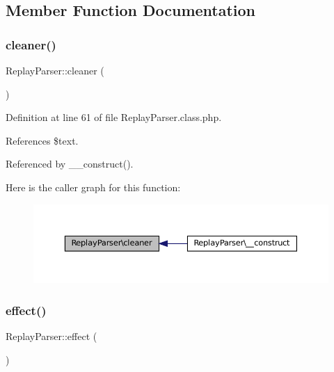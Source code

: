 \subsection{Member Function Documentation}
\mbox{\label{class_replay_parser_a0007ba7d09041393a501216af378fe87}} 
\subsubsection{\texorpdfstring{cleaner()}{cleaner()}}
{\footnotesize\ttfamily Replay\+Parser\+::cleaner (\begin{DoxyParamCaption}{ }\end{DoxyParamCaption})\hspace{0.3cm}{\ttfamily [private]}}



Definition at line 61 of file Replay\+Parser.\+class.\+php.



References \$text.



Referenced by \+\_\+\+\_\+construct().

Here is the caller graph for this function\+:\nopagebreak
\begin{figure}[H]
\begin{center}
\leavevmode
\includegraphics[width=350pt]{class_replay_parser_a0007ba7d09041393a501216af378fe87_icgraph}
\end{center}
\end{figure}
\mbox{\label{class_replay_parser_a928bb19cb57383719013f8ba5319173c}} 
\subsubsection{\texorpdfstring{effect()}{effect()}}
{\footnotesize\ttfamily Replay\+Parser\+::effect (\begin{DoxyParamCaption}{ }\end{DoxyParamCaption})}



